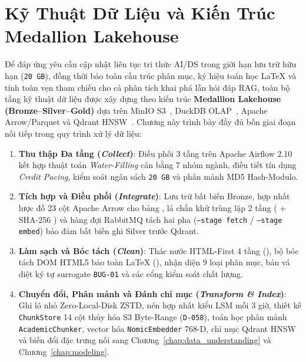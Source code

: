 
\chapter{Kỹ Thuật Dữ Liệu và Kiến Trúc Medallion Lakehouse}
\label{chap:data_preparation}

Để đáp ứng yêu cầu cập nhật liên tục tri thức AI/DS trong giới hạn lưu trữ hữu hạn (\texttt{20 GB}), đồng thời bảo toàn cấu trúc phân mục, ký hiệu toán học LaTeX và tính toàn vẹn tham chiếu cho cả phân tích khai phá lẫn hỏi đáp RAG, toàn bộ tầng kỹ thuật dữ liệu được xây dựng theo kiến trúc \textbf{Medallion Lakehouse (Bronze--Silver--Gold)} dựa trên MinIO S3~\cite{minio2023storage}, DuckDB OLAP~\cite{raasveldt2019duckdb}, Apache Arrow/Parquet và Qdrant HNSW~\cite{qdrant2023vector}. Chương này trình bày đầy đủ bốn giai đoạn nối tiếp trong quy trình xử lý dữ liệu:
\begin{enumerate}[label=\textbf{\arabic*.}]
  \item \textbf{Thu thập Đa tầng (\textit{Collect})}: Điều phối 3 tầng trên Apache Airflow 2.10 kết hợp thuật toán \textit{Water-Filling} cân bằng 7 nhóm ngành, điều tiết tín dụng \textit{Credit Pacing}, kiểm soát ngân sách \texttt{20 GB} và phân mảnh MD5 Hash-Modulo.
  \item \textbf{Tích hợp và Điều phối (\textit{Integrate})}: Lưu trữ bất biến Bronze, hợp nhất lược đồ 23 cột Apache Arrow cho bảng , lá chắn khử trùng lặp 2 tầng ( + SHA-256 ) và hàng đợi RabbitMQ tách hai pha (\texttt{--stage fetch} / \texttt{--stage embed}) bảo đảm bất biến ghi Silver trước Qdrant.
  \item \textbf{Làm sạch và Bóc tách (\textit{Clean})}: Thác nước HTML-First 4 tầng (), bộ bóc tách DOM HTML5 bảo toàn LaTeX (), nhận diện 9 loại phân mục, bản vá diệt ký tự surrogate \texttt{BUG-01} và các cổng kiểm soát chất lượng.
  \item \textbf{Chuyển đổi, Phân mảnh và Đánh chỉ mục (\textit{Transform \& Index})}: Ghi lô nhỏ Zero-Local-Disk ZSTD, nén hợp nhất kiểu LSM mỗi 3 giờ, thiết kế \texttt{ChunkStore} 14 cột thủy hóa S3 Byte-Range (\texttt{D-058}), toán học phân mảnh \texttt{AcademicChunker}, vector hóa \texttt{NomicEmbedder} 768-D, chỉ mục Qdrant HNSW và biến đổi đặc trưng nối sang Chương~\ref{chap:data_understanding} và Chương~\ref{chap:modeling}.
\end{enumerate}

